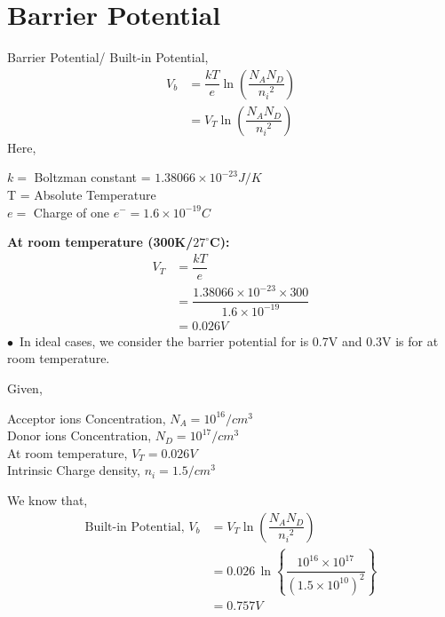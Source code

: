 \documentclass[a4aper,12pt]{report}
\begin{document}
\section{Barrier Potential}
Barrier Potential/ Built-in Potential,
\begin{align*}
    V_b &= \dfrac{kT}{e}\ln \left(\dfrac{N_AN_D}{{n_i}^2}\right) \\ 
    &= V_T\ln \left(\dfrac{N_AN_D}{{n_i}^2}\right) 
\end{align*}
Here,
\begin{adjustwidth}{1.5cm}{0pt}
    $k = $ Boltzman constant = $1.38066\times 10^{-23}J/K$ \\ 
    T = Absolute Temperature \\
    $e = $ Charge of one $e^- = 1.6\times 10^{-19}C$ 
\end{adjustwidth}
\vspace*{5pt}
\textbf{At room temperature (300K/$27^\circ $C):}
\begin{align*}
    V_T &= \dfrac{kT}{e} \\
    &= \dfrac{1.38066\times 10^{-23}\times 300}{1.6\times 10^{-19}} \\ 
    &= 0.026 V
\end{align*}
$\bullet\,\,\, $In ideal cases, we consider the barrier potential for  is 0.7V and 0.3V is for  at room temperature.
\begin{tcolorbox}[breakable, title = {\textbf{Example 1.2: }Consider a pn junction at room temperature, doped ar $N_A=10^{16}/cm^3$ in the p-region and $N_D=10^{17}/cm^3$ in the n-region. Intrinsic carrier density is $1.5/cm^3$ at room temperature. Calculate the built-in potential. }]
    Given,
    \begin{adjustwidth}{1cm}{5pt}
        Acceptor ions Concentration, $N_A =10^{16}/cm^3$ \\
        Donor ions Concentration, $N_D=10^{17}/cm^3$ \\
        At room temperature, $V_T = 0.026 V$ \\ 
        Intrinsic Charge density, $n_i = 1.5/cm^3$
    \end{adjustwidth}
    We know that,
    \begin{align*}
        \text{Built-in Potential, }V_b &= V_T\ln\left(\dfrac{N_AN_D}{{n_i}^2}\right) \\ 
        &=0.026\, \ln\left\{\dfrac{10^{16}\times 10^{17}}{(1.5\times 10^{10})^2}\right\} \\ 
        &= 0.757 V
    \end{align*}
\end{tcolorbox}
\end{document}

